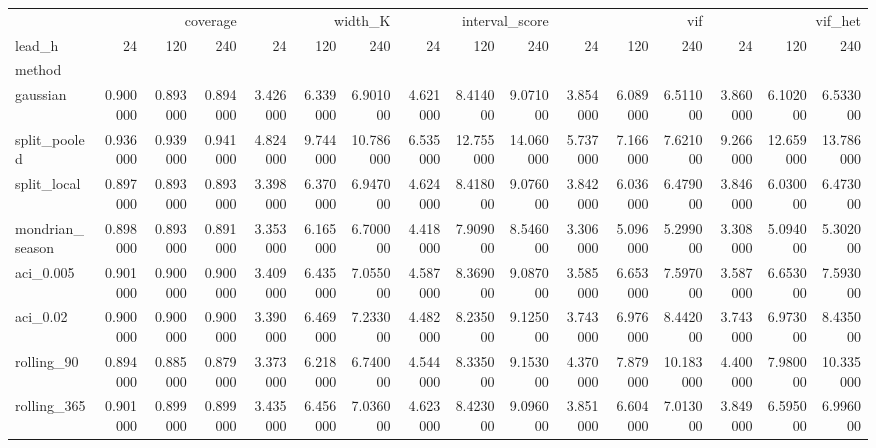 \begin{tabular}{lrrrrrrrrrrrrrrr}
\toprule
 & \multicolumn{3}{r}{coverage} & \multicolumn{3}{r}{width_K} & \multicolumn{3}{r}{interval_score} & \multicolumn{3}{r}{vif} & \multicolumn{3}{r}{vif_het} \\
lead_h & 24 & 120 & 240 & 24 & 120 & 240 & 24 & 120 & 240 & 24 & 120 & 240 & 24 & 120 & 240 \\
method &  &  &  &  &  &  &  &  &  &  &  &  &  &  &  \\
\midrule
gaussian & 0.900000 & 0.893000 & 0.894000 & 3.426000 & 6.339000 & 6.901000 & 4.621000 & 8.414000 & 9.071000 & 3.854000 & 6.089000 & 6.511000 & 3.860000 & 6.102000 & 6.533000 \\
split_pooled & 0.936000 & 0.939000 & 0.941000 & 4.824000 & 9.744000 & 10.786000 & 6.535000 & 12.755000 & 14.060000 & 5.737000 & 7.166000 & 7.621000 & 9.266000 & 12.659000 & 13.786000 \\
split_local & 0.897000 & 0.893000 & 0.893000 & 3.398000 & 6.370000 & 6.947000 & 4.624000 & 8.418000 & 9.076000 & 3.842000 & 6.036000 & 6.479000 & 3.846000 & 6.030000 & 6.473000 \\
mondrian_season & 0.898000 & 0.893000 & 0.891000 & 3.353000 & 6.165000 & 6.700000 & 4.418000 & 7.909000 & 8.546000 & 3.306000 & 5.096000 & 5.299000 & 3.308000 & 5.094000 & 5.302000 \\
aci_0.005 & 0.901000 & 0.900000 & 0.900000 & 3.409000 & 6.435000 & 7.055000 & 4.587000 & 8.369000 & 9.087000 & 3.585000 & 6.653000 & 7.597000 & 3.587000 & 6.653000 & 7.593000 \\
aci_0.02 & 0.900000 & 0.900000 & 0.900000 & 3.390000 & 6.469000 & 7.233000 & 4.482000 & 8.235000 & 9.125000 & 3.743000 & 6.976000 & 8.442000 & 3.743000 & 6.973000 & 8.435000 \\
rolling_90 & 0.894000 & 0.885000 & 0.879000 & 3.373000 & 6.218000 & 6.740000 & 4.544000 & 8.335000 & 9.153000 & 4.370000 & 7.879000 & 10.183000 & 4.400000 & 7.980000 & 10.335000 \\
rolling_365 & 0.901000 & 0.899000 & 0.899000 & 3.435000 & 6.456000 & 7.036000 & 4.623000 & 8.423000 & 9.096000 & 3.851000 & 6.604000 & 7.013000 & 3.849000 & 6.595000 & 6.996000 \\
\bottomrule
\end{tabular}
